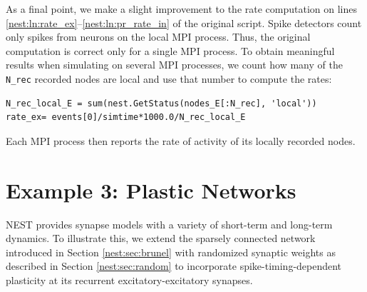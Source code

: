 \documentclass{article}
\begin{document}
As a final point, we make a slight improvement to the rate computation on
lines \ref{nest:ln:rate_ex}--\ref{nest:ln:pr_rate_in} of the original
script. Spike detectors count only spikes from neurons on the local
MPI process. Thus, the original computation is correct only for a
single MPI process. To obtain meaningful results when simulating
on several MPI processes, we count how many of the \lstinline!N_rec!
recorded nodes are local and use that number to compute the rates:
\begin{lstlisting}[name=brunel-rand]
N_rec_local_E = sum(nest.GetStatus(nodes_E[:N_rec], 'local'))
rate_ex= events[0]/simtime*1000.0/N_rec_local_E
\end{lstlisting}
Each MPI process then reports the rate of activity of its locally
recorded nodes.



\section{Example 3: Plastic Networks}\label{nest:sec:plastic}

\renewcommand*\thelstnumber{p\arabic{lstnumber}}

NEST provides synapse models with a variety of short-term and
long-term dynamics. To illustrate this, we extend the sparsely
connected network introduced in Section \ref{nest:sec:brunel} with
randomized synaptic weights as described in Section
\ref{nest:sec:random} to incorporate spike-timing-dependent plasticity
\citep{Bi98} at its recurrent excitatory-excitatory synapses.
\end{document}
